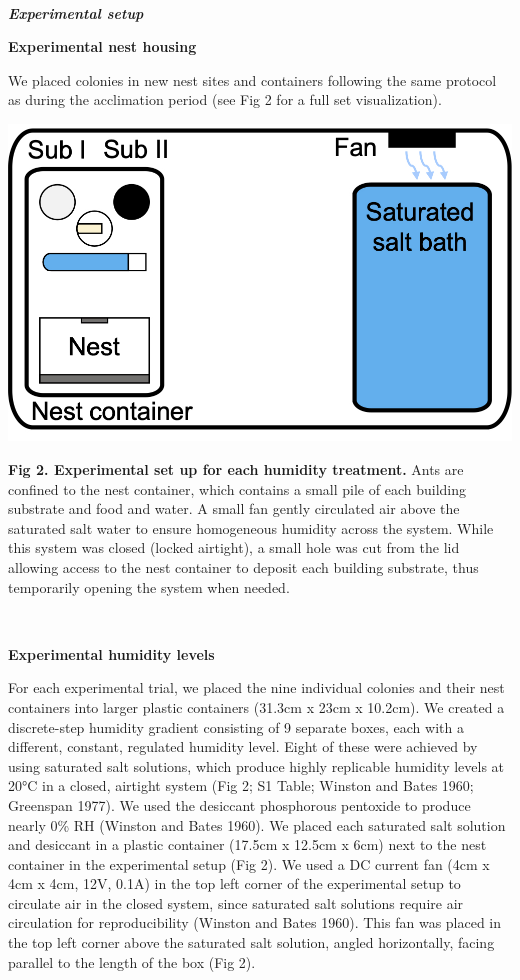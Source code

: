 \documentclass[3p]{elsarticle} %
\begin{document}
~

\textbf{\emph{Experimental setup}}

\textbf{Experimental nest housing}

We placed colonies in new nest sites and containers following the same
protocol as during the acclimation period (see Fig 2 for a full set
visualization).

\begin{flushleft}\includegraphics[width=0.75\linewidth,height=0.37\textheight]{../figures/Fig2} \end{flushleft}

\textbf{Fig 2. Experimental set up for each humidity treatment.} Ants
are confined to the nest container, which contains a small pile of each
building substrate and food and water. A small fan gently circulated air
above the saturated salt water to ensure homogeneous humidity across the
system. While this system was closed (locked airtight), a small hole was
cut from the lid allowing access to the nest container to deposit each
building substrate, thus temporarily opening the system when needed.

~

\textbf{Experimental humidity levels}

For each experimental trial, we placed the nine individual colonies and
their nest containers into larger plastic containers (31.3cm x 23cm x
10.2cm). We created a discrete-step humidity gradient consisting of 9
separate boxes, each with a different, constant, regulated humidity
level. Eight of these were achieved by using saturated salt solutions,
which produce highly replicable humidity levels at 20°C in a closed,
airtight system (Fig 2; S1 Table; Winston and Bates 1960; Greenspan
1977). We used the desiccant phosphorous pentoxide to produce nearly 0\%
RH (Winston and Bates 1960). We placed each saturated salt solution and
desiccant in a plastic container (17.5cm x 12.5cm x 6cm) next to the
nest container in the experimental setup (Fig 2). We used a DC current
fan (4cm x 4cm x 4cm, 12V, 0.1A) in the top left corner of the
experimental setup to circulate air in the closed system, since
saturated salt solutions require air circulation for reproducibility
(Winston and Bates 1960). This fan was placed in the top left corner
above the saturated salt solution, angled horizontally, facing parallel
to the length of the box (Fig 2).
\end{document}
